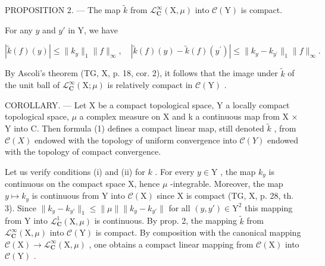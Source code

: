 PROPOSITION 2. — The map \(\widetilde{k}\) from \(\mathcal{L}_{\mathbf{C}}^{\infty}(\mathrm{X},\mu)\) into \(\mathcal{C}(\mathrm{Y})\) is compact.

For any \(y\) and \(y'\) in Y, we have

\[
| \widetilde {k} (f) (y) | \leqslant \| k _ {y} \| _ {1} \| f \| _ {\infty}, \quad | \widetilde {k} (f) (y) - \widetilde {k} (f) (y ^ {\prime}) | \leqslant \| k _ {y} - k _ {y ^ {\prime}} \| _ {1} \| f \| _ {\infty}.
\]

By Ascoli's theorem (TG, X, p. 18, cor. 2), it follows that the image under \(\widetilde{k}\) of the unit ball of \(\mathcal{L}_{\mathbf{C}}^{\infty}(\mathrm{X};\mu)\) is relatively compact in \(\mathcal{C}(\mathrm{Y})\) .

COROLLARY. --- Let X be a compact topological space, Y a locally compact topological space, \(\mu\) a complex measure on X and k a continuous map from X × Y into C. Then formula (1) defines a compact linear map, still denoted \(\widetilde{k}\) , from \(\mathcal{C}(X)\) endowed with the topology of uniform convergence into \(\mathcal{C}(Y)\) endowed with the topology of compact convergence.

Let us verify conditions (i) and (ii) for \(k\) . For every \(y \in \mathrm{Y}\) , the map \(k_y\) is continuous on the compact space X, hence \(\mu\) -integrable. Moreover, the map \(y \mapsto k_y\) is continuous from Y into \(\mathcal{C}(\mathrm{X})\) since X is compact (TG, X, p. 28, th. 3). Since \(\| k_y - k_{y'} \|_1 \leqslant \| \mu \| \| k_y - k_{y'} \|\) for all \((y, y') \in \mathrm{Y}^2\) this mapping from Y into \(\mathcal{L}_{\mathbf{C}}^1(\mathrm{X}, \mu)\) is continuous. By prop. 2, the mapping \(\widetilde{k}\) from \(\mathcal{L}_{\mathbf{C}}^\infty(\mathrm{X}, \mu)\) into \(\mathcal{C}(\mathrm{Y})\) is compact. By composition with the canonical mapping \(\mathcal{C}(\mathrm{X}) \to \mathcal{L}_{\mathbf{C}}^\infty(\mathrm{X}, \mu)\) , one obtains a compact linear mapping from \(\mathcal{C}(\mathrm{X})\) into \(\mathcal{C}(\mathrm{Y})\) .